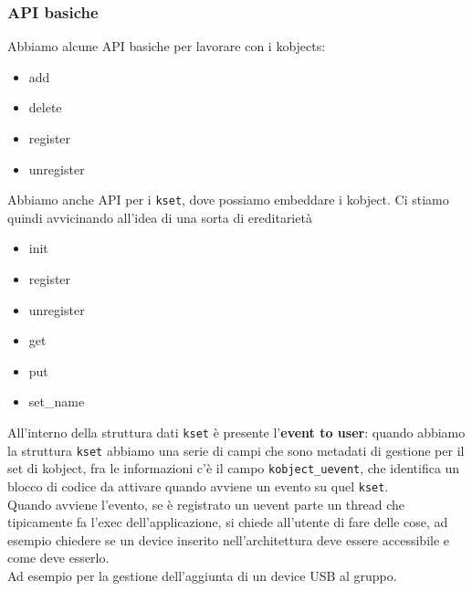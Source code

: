 \documentclass[12pt, oneside]{extbook}
\begin{document}
\subsubsection{API basiche}
Abbiamo alcune API basiche per lavorare con i kobjects:
\begin{itemize}
	\item add
	\item delete
	\item register
	\item unregister
\end{itemize}
Abbiamo anche API per i \texttt{kset}, dove possiamo embeddare i kobject. Ci stiamo quindi avvicinando all'idea di una sorta di ereditarietà
\begin{itemize}
	\item init
	\item register
	\item unregister
	\item get
	\item put
	\item set\_name
\end{itemize}
All'interno della struttura dati \texttt{kset} è presente l'\textbf{event to user}: quando abbiamo la struttura \texttt{kset} abbiamo una serie di campi che sono metadati di gestione per il set di kobject, fra le informazioni c'è il campo \texttt{kobject\_uevent}, che identifica un blocco di codice da attivare quando avviene un evento su quel \texttt{kset}.\\Quando avviene l'evento, se è registrato un uevent parte un thread che tipicamente fa l'exec dell'applicazione, si chiede all'utente di fare delle cose, ad esempio chiedere se un device inserito nell'architettura deve essere accessibile e come deve esserlo.\\Ad esempio per la gestione dell'aggiunta di un device USB al gruppo. 
\end{document}
